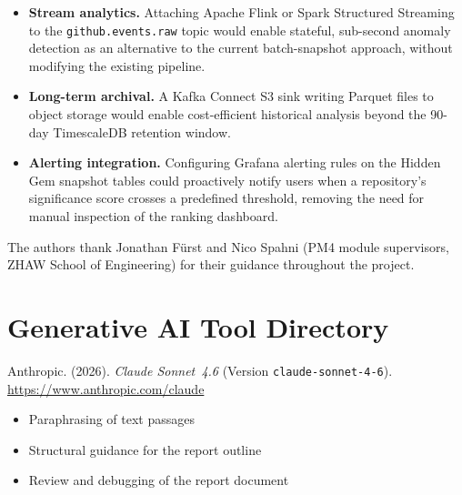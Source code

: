 \documentclass[sigconf]{acmart}
\begin{document}
\begin{itemize}
  \item \textbf{Stream analytics.} Attaching Apache Flink or Spark
    Structured Streaming to the \texttt{github.events.raw} topic would
    enable stateful, sub-second anomaly detection as an alternative to the
    current batch-snapshot approach, without modifying the existing pipeline.
  \item \textbf{Long-term archival.} A Kafka Connect S3 sink writing Parquet
    files to object storage would enable cost-efficient historical analysis
    beyond the 90-day TimescaleDB retention window.
  \item \textbf{Alerting integration.} Configuring Grafana alerting rules on
    the Hidden Gem snapshot tables could proactively notify users when a
    repository's significance score crosses a predefined threshold, removing
    the need for manual inspection of the ranking dashboard.
\end{itemize}

\begin{acks}
The authors thank Jonathan Fürst and Nico Spahni (PM4 module supervisors,
ZHAW School of Engineering) for their guidance throughout the project.
\end{acks}



\newpage

\section*{Generative AI Tool Directory}

\noindent
Anthropic. (2026). \textit{Claude Sonnet~4.6}
(Version \texttt{claude-sonnet-4-6}).
\url{https://www.anthropic.com/claude}
\begin{itemize}
  \item Paraphrasing of text passages
  \item Structural guidance for the report outline
  \item Review and debugging of the report document
\end{itemize}

\clearpage
\onecolumn
\appendix
\end{document}
